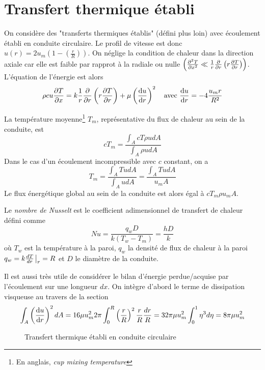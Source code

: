   \section{Transfert thermique établi}
    On considère des "transferts thermiques établis" (défini plus loin) avec écoulement établi en conduite circulaire. Le profil de vitesse est donc $u(r) = 2 u_m \left(1 - \left(\frac{r}{R}\right)\right)$. On néglige la condition de chaleur dans la direction axiale car elle est faible par rapprot à la radiale ou nulle $\left(\pdv[2]{T}{x} \ll \frac{1}{r}\pdv{r}\left(r\pdv{T}{r}\right)\right)$. L'équation de l'énergie est alors
    \begin{equation}
      \rho c u \pdv{T}{x} = k \frac{1}{r}\pdv{r} \left(r\pdv{T}{r}\right) + \mu \left(\dv{u}{r}\right)^2 \quad \textrm{avec } \dv{u}{r} = -4\frac{u_mr}{R^2}
    \end{equation}

    La température moyenne\footnote{En anglais, \textit{cup mixing temperature}} $T_m$, représentative du flux de chaleur au sein de la conduite, est
    \begin{equation}
      cT_m = \frac{\int_A c T \rho u dA}{\int_A \rho u dA}
    \end{equation}
    Dans le cas d'un écoulement incompressible avec $c$ constant, on a
    \begin{equation}
      T_m = \frac{\int_A T u dA}{\int_A u dA} = \frac{\int_A T u dA}{u_m A}
    \end{equation}
    Le flux énergétique global au sein de la conduite est alors égal à $c T_m \rho u_m A$.

    Le \textit{nombre de Nusselt} est le coefficient adimensionnel de transfert de chaleur défini comme
    \begin{equation}
      Nu = \frac{q_w D}{k (T_w - T_m)} = \frac{h D}{k}
    \end{equation}
    où $T_w$ est la température à la paroi, $q_w$ la densité de flux de chaleur à la paroi $q_w = k \frac{dT}{dr}\eval_r=R$ et $D$ le diamètre de la conduite.

    Il est aussi très utile de considérer le bilan d'énergie perdue/acquise par l'écoulement sur une longueur $dx$. On intègre d'abord le terme de dissipation visqueuse au travers de la section
    \begin{equation}
      \int_A \left(\dv{u}{r}\right)^2 dA = 16 \mu u_m^2 2\pi \int_0^R \left(\frac{r}{R}\right)^2 \frac{r}{R} \frac{dr}{R} = 32 \pi\mu u_m^2 \int_0^1 \eta^3 d\eta = 8 \pi \mu u_m^2
    \end{equation}
    \begin{figure}[!h]
      \centering
      
      \caption{Transfert thermique établi en conduite circulaire}
      \label{fig:transthermCond}
    \end{figure}

